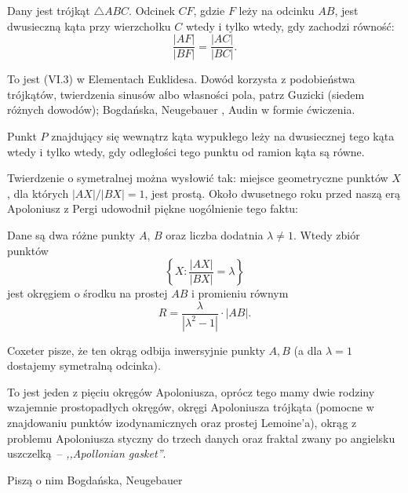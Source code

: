 
\begin{proposition}
	Dany jest trójkąt $\triangle ABC$.
	Odcinek $CF$, gdzie $F$ leży na odcinku $AB$, jest dwusieczną kąta przy wierzchołku $C$ wtedy i tylko wtedy, gdy zachodzi równość:
	\begin{equation}
		\frac{|AF|}{|BF|} = \frac{|AC|}{|BC|}.
	\end{equation}
\end{proposition}

To jest (VI.3) w Elementach Euklidesa.
Dowód korzysta z podobieństwa trójkątów, twierdzenia sinusów albo własności pola, patrz Guzicki \cite[s. 120]{guzicki_2021} (siedem różnych dowodów); Bogdańska, Neugebauer \cite[s. 73]{neugebauer_2018}, Audin \cite[s. 102]{audin_2003} w formie ćwiczenia.

\begin{proposition} %
	Punkt $P$ znajdujący się wewnątrz kąta wypukłego leży na dwusiecznej tego kąta wtedy i tylko wtedy, gdy odległości tego punktu od ramion kąta są równe.
\end{proposition}




Twierdzenie o symetralnej %
można wysłowić tak: miejsce geometryczne punktów $X$, dla których $|AX|/|BX| = 1$, jest prostą.
Około dwusetnego roku przed naszą erą Apoloniusz z Pergi udowodnił piękne uogólnienie tego faktu:

\begin{definition} %
	Dane są dwa różne punkty $A$, $B$ oraz liczba dodatnia $\lambda \neq 1$.
	Wtedy zbiór punktów 
	\begin{equation}
		\left\{X : \frac{|AX|}{|BX|} = \lambda \right\}
	\end{equation}
	jest okręgiem o środku na prostej $AB$ i promieniu równym
	\begin{equation}
		R = \frac{\lambda}{|\lambda^2 - 1|} \cdot |AB|.
	\end{equation}
\end{definition}

Coxeter \cite[s. 104, 105]{coxeter_1967} pisze, że ten okrąg odbija inwersyjnie punkty $A, B$ (a dla $\lambda = 1$ dostajemy symetralną odcinka).

To jest jeden z pięciu okręgów Apoloniusza, oprócz tego mamy dwie rodziny wzajemnie prostopadłych okręgów, okręgi Apoloniusza trójkąta (pomocne w znajdowaniu punktów izodynamicznych oraz prostej Lemoine'a), okrąg z problemu Apoloniusza styczny do trzech danych oraz fraktal zwany po angielsku uszczelką -- \emph{,,Apollonian gasket''}.

Piszą o nim Bogdańska, Neugebauer \cite[s. 74]{neugebauer_2018}